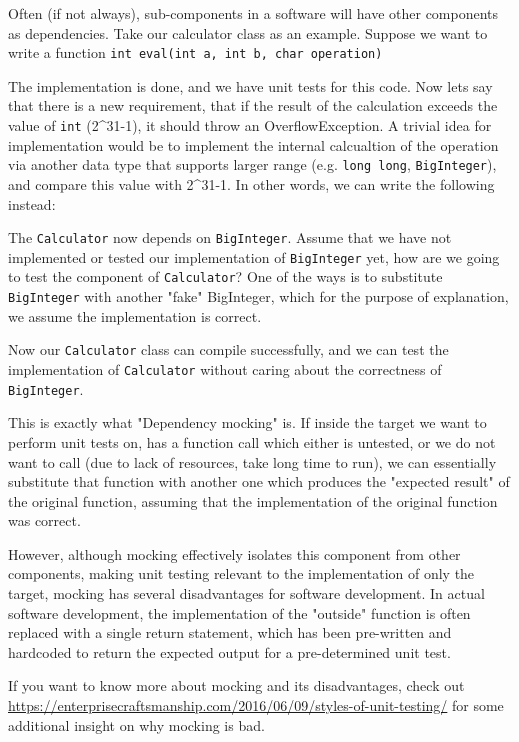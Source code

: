 Often (if not always), sub-components in a software will have other components as dependencies. Take our calculator class as an example. Suppose we want to write a function \texttt{int eval(int a, int b, char operation)}


The implementation is done, and we have unit tests for this code. Now lets say that there is a new requirement, that if the result of the calculation exceeds the value of \texttt{int} (2^{31}-1), it should throw an OverflowException. A trivial idea for implementation would be to implement the internal calcualtion of the operation via another data type that supports larger range (e.g. \texttt{long long}, \texttt{BigInteger}), and compare this value with 2^{31}-1. In other words, we can write the following instead:


The \texttt{Calculator} now depends on \texttt{BigInteger}. Assume that we have not implemented or tested our implementation of \texttt{BigInteger} yet, how are we going to test the component of \texttt{Calculator}? One of the ways is to substitute \texttt{BigInteger} with another "fake" BigInteger, which for the purpose of explanation, we assume the implementation is correct.


Now our \texttt{Calculator} class can compile successfully, and we can test the implementation of \texttt{Calculator} without caring about the correctness of \texttt{BigInteger}. 

This is exactly what "Dependency mocking" is. If inside the target we want to perform unit tests on, has a function call which either is untested, or we do not want to call (due to lack of resources, take long time to run), we can essentially substitute that function with another one which produces the "expected result" of the original function, assuming that the implementation of the original function was correct. 

However, although mocking effectively isolates this component from other components, making unit testing relevant to the implementation of only the target, mocking has several disadvantages for software development. In actual software development, the implementation of the "outside" function is often replaced with a single return statement, which has been pre-written and hardcoded to return the expected output for a pre-determined unit test. 

If you want to know more about mocking and its disadvantages, check out \url{https://enterprisecraftsmanship.com/2016/06/09/styles-of-unit-testing/} for some additional insight on why mocking is bad. 